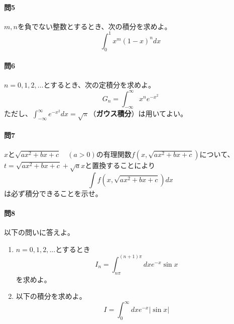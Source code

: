 \documentclass[a4j,dvipdfmx]{jsarticle}
\begin{document}
            \paragraph{問5}$m,n$を負でない整数とするとき、次の積分を求めよ。
                \begin{equation*}
                    \int_0^1 x^m(1-x)^ndx
                \end{equation*}

            \paragraph{問6}$n=0,1,2,\dots$とするとき、次の定積分を求めよ。
                \begin{equation*}
                    G_{n}=\int_{-\infty}^{\infty}x^{n}e^{-x^2}
                \end{equation*}
                ただし、$\displaystyle \int_{-\infty}^{\infty}e^{-x^2}dx=\sqrt{\pi}$（\textbf{ガウス積分}）は用いてよい。

            \paragraph{問7}$x$と$\sqrt{ax^2+bx+c}\quad(a>0)$の有理関数$f(x,\sqrt{ax^2+bx+c})$について、$t=\sqrt{ax^2+bx+c}+\sqrt{a}x$と置換することにより
                \begin{equation*}
                    \int f(x,\sqrt{ax^2+bx+c})dx
                \end{equation*}
                は必ず積分できることを示せ。
            \clearpage
            \paragraph{問8}以下の問いに答えよ。
            \begin{enumerate}\setcounter{enumi}{0}\renewcommand{\labelenumi}{(\arabic{enumi})}
                \item $n=0,1,2,\dots$とするとき
                    \begin{equation*}
                        I_n=\int_{n\pi}^{(n+1)\pi}dxe^{-x}\sin x
                    \end{equation*}を求めよ。
                \item 以下の積分を求めよ。
                    \begin{equation*}
                        I=\int_{0}^{\infty}dx e^{-x}|\sin x|
                        \end{equation*}
            \end{enumerate}
\end{document}
